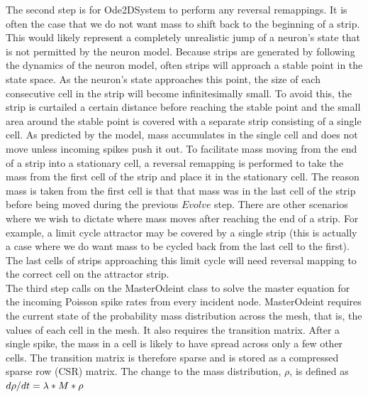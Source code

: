 \documentclass[utf8]{frontiers_suppmat} %
\begin{document}
The second step is for Ode2DSystem to perform any reversal remappings. It is often the case that we do not want mass to shift back to the beginning of a strip. This would likely represent a completely unrealistic jump of a neuron's state that is not permitted by the neuron model. Because strips are generated by following the dynamics of the neuron model, often strips will approach a stable point in the state space. As the neuron's state approaches this point, the size of each consecutive cell in the strip will become infinitesimally small. To avoid this, the strip is curtailed a certain distance before reaching the stable point and the small area around the stable point is covered with a separate strip consisting of a single cell. As predicted by the model, mass accumulates in the single cell and does not move unless incoming spikes push it out. To facilitate mass moving from the end of a strip into a stationary cell, a reversal remapping is performed to take the mass from the first cell of the strip and place it in the stationary cell. The reason mass is taken from the first cell is that that mass was in the last cell of the strip before being moved during the previous $Evolve$ step. There are other scenarios where we wish to dictate where mass moves after reaching the end of a strip. For example, a limit cycle attractor may be covered by a single strip (this is actually a case where we do want mass to be cycled back from the last cell to the first). The last cells of strips approaching this limit cycle will need reversal mapping to the correct cell on the attractor strip.\\

The third step calls on the MasterOdeint class to solve the master equation for the incoming Poisson spike rates from every incident node. MasterOdeint requires the current state of the probability mass distribution across the mesh, that is, the values of each cell in the mesh. It also requires the transition matrix. After a single spike, the mass in a cell is likely to have spread across only a few other cells. The transition matrix is therefore sparse and is stored as a compressed sparse row (CSR) matrix. The change to the mass distribution, $\rho$, is defined as \\

$d\rho/dt = \lambda * M * \rho \\$
\end{document}
